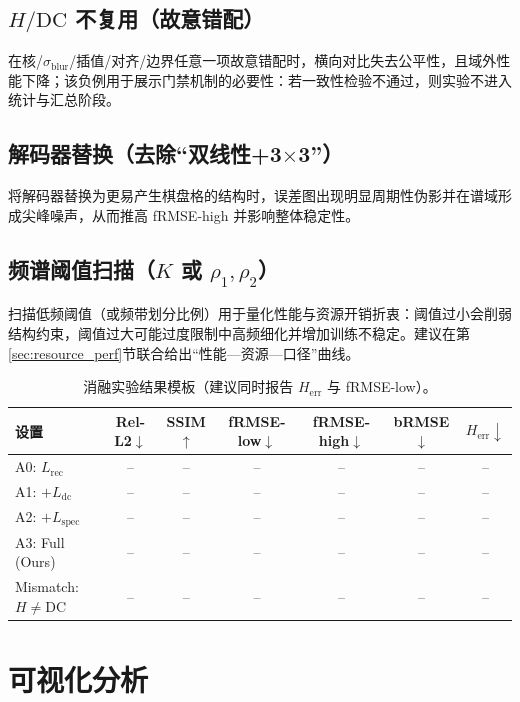 \subsection{\texorpdfstring{$H/\mathrm{DC}$}{H/DC} 不复用（故意错配）}\label{sec:ablate_mismatch}
在核/$\sigma_{\text{blur}}$/插值/对齐/边界任意一项故意错配时，横向对比失去公平性，且域外性能下降；该负例用于展示门禁机制的必要性：若一致性检验不通过，则实验不进入统计与汇总阶段。

\subsection{解码器替换（去除“双线性+3\texorpdfstring{$\times$}{x}3”）}\label{sec:ablate_decoder}
将解码器替换为更易产生棋盘格的结构时，误差图出现明显周期性伪影并在谱域形成尖峰噪声，从而推高 fRMSE-high 并影响整体稳定性。

\subsection{频谱阈值扫描（\texorpdfstring{$K$}{K} 或 \texorpdfstring{$\rho_1,\rho_2$}{rho1,rho2}）}\label{sec:ablate_k_scan}
扫描低频阈值（或频带划分比例）用于量化性能与资源开销折衷：阈值过小会削弱结构约束，阈值过大可能过度限制中高频细化并增加训练不稳定。建议在第\ref{sec:resource_perf}节联合给出“性能—资源—口径”曲线。

\begin{table}[t]
\centering
\caption{消融实验结果模板（建议同时报告 $H_{\mathrm{err}}$ 与 fRMSE-low）。}
\label{tab:ablation_ch6}
\begin{tabular}{lcccccc}
\toprule
设置 & Rel-L2$\downarrow$ & SSIM$\uparrow$ & fRMSE-low$\downarrow$ & fRMSE-high$\downarrow$ & bRMSE$\downarrow$ & $H_{\mathrm{err}}\downarrow$\\
\midrule
A0: $L_{\mathrm{rec}}$ & -- & -- & -- & -- & -- & --\\
A1: $+L_{\mathrm{dc}}$ & -- & -- & -- & -- & -- & --\\
A2: $+L_{\mathrm{spec}}$ & -- & -- & -- & -- & -- & --\\
A3: Full (Ours) & -- & -- & -- & -- & -- & --\\
\midrule
Mismatch: $H\neq \mathrm{DC}$ & -- & -- & -- & -- & -- & --\\
\bottomrule
\end{tabular}
\end{table}

\section{可视化分析}\label{sec:visualization}

